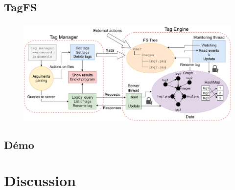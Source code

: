 \documentclass[10pt]{beamer}
\begin{document}
\subsection{TagFS}
\begin{frame}
    \frametitle{\subsecname}
    \begin{center}
        \begin{figure}
            \includegraphics[width=1\textwidth]{images/tagfs4.png}
        \end{figure}
    \end{center}
\end{frame}

\subsection{Démo}
\begin{frame}
    \frametitle{\subsecname}
\end{frame}

\section{Discussion}
\end{document}
